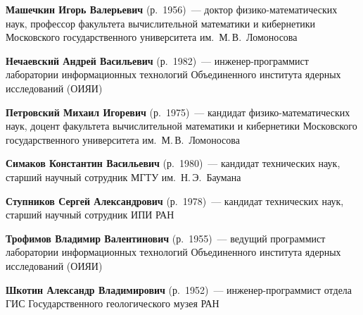 \begin{multicols}{2}
\def\leftkol{ОБ АВТОРАХ}
\def\rightkol{ОБ АВТОРАХ}

\vspace*{4pt}

\noindent
\textbf{Машечкин Игорь Валерьевич}  (р.\ 1956)~--- доктор фи\-зи\-ко-ма\-те\-ма\-ти\-че\-ских наук, 
профессор факультета вычислительной математики и кибернетики Московского 
государственного университета им.\ М.\,В.~Ломоносова

\vspace*{4pt}

\noindent
\textbf{Нечаевский Андрей Васильевич} (р.\ 1982)~---
ин\-же\-нер-про\-грам\-мист лаборатории информационных технологий Объединенного 
института ядерных исследований (ОИЯИ)

\vspace*{4pt}

\def\leftkol{ОБ АВТОРАХ}
\def\rightkol{ОБ АВТОРАХ}

\noindent
\textbf{Петровский Михаил Игоревич}  (р.\ 1975)~--- кандидат фи\-зи\-ко-ма\-те\-ма\-ти\-че\-ских наук, 
доцент факультета вычислительной математики и кибернетики Московского 
государственного университета им.\ М.\,В.~Ломоносова

\vspace*{4pt}

\noindent
\textbf{Симаков Константин Васильевич} (р.\ 1980)~--- кандидат 
технических наук, старший научный сотрудник МГТУ им.\ Н.\,Э.~Баумана

\def\leftkol{ОБ АВТОРАХ}
\def\rightkol{ОБ АВТОРАХ}


\vspace*{4pt}

\noindent
\textbf{Ступников Сергей Александрович} (р.\ 1978)~--- кандидат технических наук, старший 
научный сотрудник ИПИ РАН


\vspace*{4pt}

\noindent
\textbf{Трофимов Владимир Валентинович} (р.\ 1955)~---
ведущий программист лаборатории информационных технологий Объединенного 
института ядерных исследований (ОИЯИ)



\vspace*{4pt}

\noindent
\textbf{Шкотин Александр Владимирович} (р.\ 1952)~--- ин\-же\-нер-про\-грам\-мист отдела ГИС 
Государственного геологического музея РАН




\def\leftkol{ОБ АВТОРАХ}
\def\rightkol{ОБ АВТОРАХ}









\end{multicols}

\newpage